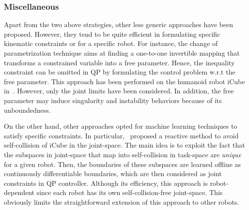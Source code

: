 
\subsubsection{Miscellaneous}
Apart from the two above strategies, other less generic approaches have been proposed. However, they tend to be quite efficient in formulating specific kinematic constraints or for a specific robot. For instance, the change of parametrization technique aims at finding a one-to-one invertible mapping that transforms a constrained variable into a free parameter. Hence, the inequality constraint can be omitted in QP by formulating the control problem w.r.t the free parameter. This approach has been performed on the humanoid robot iCube in~\cite{charbonneau2016humanoids,gazar2021tro}. However, only the joint limits have been considered. In addition, the free parameter may induce singularity and instability behaviors because of its unboundedness.

On the other hand, other approaches opted for machine learning techniques to satisfy specific constraints. In particular,~\cite{koptev2021ral} proposed a reactive method to avoid self-collision of iCube in the joint-space. The main idea is to exploit the fact that the subspaces in joint-space that map into self-collision in task-space are \emph{unique} for a given robot. Then, the boundaries of these subspaces are learned offline as continuously differentiable boundaries, which are then considered as joint constraints in QP controller. Although its efficiency, this approach is robot-dependent since each robot has its own self-collision-free joint-space. This obviously limits the straightforward extension of this approach to other robots.    %
